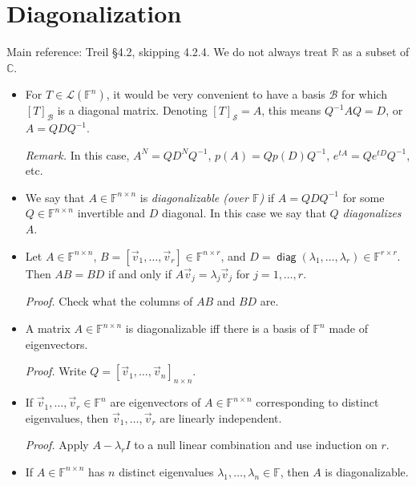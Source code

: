 \documentclass[11pt]{article}
\newcommand{\1}{\mathbf{1}}
\newcommand{\0}{\mathbf{0}}
\newcommand{\B}{\mathcal{B}}
\newcommand{\C}{\mathbb{C}}
\newcommand{\F}{\mathbb{F}}
\newcommand{\cL}{\mathcal{L}}
\newcommand{\R}{\mathbb{R}}
\newcommand{\cS}{\mathcal{S}}
\DeclareMathOperator{\mydiag}{\mathsf{diag}}
\newcommand{\vv}{\vec{v}}
\newcommand{\spitem}{\item[$\circ$]}
\begin{document}
\clearpage
\section{Diagonalization}
\label{sec:diagonalization}

Main reference:
Treil
\S4.2, skipping 4.2.4.
We do not always treat $\R$ as a subset of $\C$.

\begin{itemize}

\spitem

For $T \in \cL(\F^n)$, it would be very convenient to have a basis $\B$ for which $[T]_\B$ is a diagonal matrix.
Denoting $[T]_\cS = A$, this means $Q^{-1} A Q = D$, or $A=QDQ^{-1}$.

\emph{Remark.}
In this case,
$A^N = Q D^N Q^{-1}$,
$p(A) = Q p(D) Q^{-1}$,
$e^{tA} = Q e^{tD} Q^{-1}$, etc.

\spitem

We say that $A \in \F^{n \times n}$ is \emph{diagonalizable (over $\F$)} if $A = QDQ^{-1}$ for some $Q \in \F^{n \times n}$ invertible and $D$ diagonal.
In this case we say that \emph{$Q$ diagonalizes $A$}.

\spitem

Let $A \in \F^{n \times n}$, $B = [\vv_1,\dots,\vv_r] \in \F^{n \times r}$, and $D = \mydiag(\lambda_1,\dots,\lambda_r) \in \F^{r \times r}$.
\\
Then
$AB = BD$
if and only if
$A\vv_j = \lambda_j \vv_j$ for $j=1,\dots,r$.

\emph{Proof.}
Check what the columns of $AB$ and $BD$ are.

\item

A matrix $A \in \F^{n \times n}$ is diagonalizable iff there is a basis of $\F^n$ made of eigenvectors.

\emph{Proof.}
Write $Q = [\vv_1,\dots,\vv_n]_{n \times n}$.

\item

If $\vv_1,\dots,\vv_r \in \F^n$ are eigenvectors of $A \in \F^{n \times n}$ corresponding to distinct eigenvalues, then $\vv_1,\dots,\vv_r$ are linearly independent.

\emph{Proof.}
Apply $ A - \lambda_r I $ to a null linear combination and use induction on $r$.

\item

If $A \in \F^{n \times n}$ has $n$ distinct eigenvalues $\lambda_1,\dots,\lambda_n \in \F$, then $A$ is diagonalizable.


\end{itemize}
\end{document}
